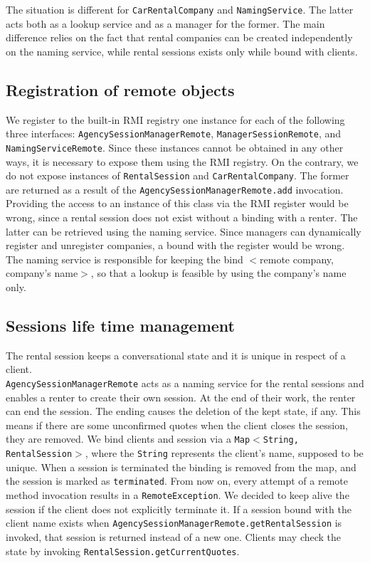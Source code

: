 The situation is different for \texttt{CarRentalCompany} and \texttt{NamingService}. The latter acts both as a lookup service and as a manager for the former. The main difference relies on the fact that rental companies can be created independently on the naming service, while rental sessions exists only while bound with clients. 


\subsection{Registration of remote objects}
We register to the built-in RMI registry one instance for each of the following three interfaces: \texttt{AgencySessionManagerRemote}, \texttt{ManagerSessionRemote}, and \texttt{NamingServiceRemote}. Since these instances cannot be obtained in any other ways, it is necessary to expose them using the RMI registry. On the contrary, we do not expose instances of \texttt{RentalSession} and \texttt{CarRentalCompany}. The former are returned as a result of the \texttt{AgencySessionManagerRemote.add} invocation. Providing the access to an instance of this class via the RMI register would be wrong, since a rental session does not exist without a binding with a renter. The latter can be retrieved using the naming service.
Since managers can dynamically register and unregister companies, a bound with the register would be wrong. The naming service is responsible for keeping the bind $<$remote company, company's name$>$, so that a lookup is feasible by using the company's name only.

\subsection{Sessions life time management}
The rental session keeps a conversational state and it is unique in respect of a client. \\\texttt{AgencySessionManagerRemote} acts as a naming service for the rental sessions and enables a renter to create their own session. At the end of their work, the renter can end the session. The ending causes the deletion of the kept state, if any. This means if there are some unconfirmed quotes when the client closes the session, they are removed. We bind clients and session via a \texttt{Map$<$String, RentalSession$>$}, where the \texttt{String} represents the client's name, supposed to be unique. When a session is terminated the binding is removed from the map, and the session is marked as \texttt{terminated}. From now on, every attempt of a remote method invocation results in a \texttt{RemoteException}. We decided to keep alive the session if the client does not explicitly terminate it. If a session bound with the client name exists when \texttt{AgencySessionManagerRemote.getRentalSession} is invoked, that session is returned instead of a new one. Clients may check the state by invoking \texttt{RentalSession.getCurrentQuotes}.

